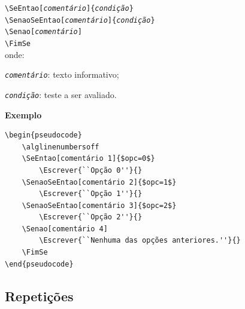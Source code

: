 \documentclass[a4paper,12pt,oneside,onecolumn,final,fleqn]{repUERJ}
\begin{document}
\begin{alinea}
  \item \texttt{\textbackslash SeEntao[\textit{comentário}]\{\textit{condição}\}}\\
        \texttt{\textbackslash SenaoSeEntao[\textit{comentário}]\{\textit{condição}\}}\\
        \texttt{\textbackslash Senao[\textit{comentário}]}\\
        \texttt{\textbackslash FimSe}\\
        onde:
        \begin{alinea}
            \item \textit{\texttt{comentário}}: texto
                  informativo;
            \item \textit{\texttt{condição}}: teste a ser
                  avaliado.\\
        \end{alinea}
\end{alinea}

\noindent\textbf{Exemplo}

\begin{verbatim}
\begin{pseudocode}
    \alglinenumbersoff
    \SeEntao[comentário 1]{$opc=0$}
        \Escrever{``Opção 0''}{}
    \SenaoSeEntao[comentário 2]{$opc=1$}
        \Escrever{``Opção 1''}{}
    \SenaoSeEntao[comentário 3]{$opc=2$}
        \Escrever{``Opção 2''}{}
    \Senao[comentário 4]
        \Escrever{``Nenhuma das opções anteriores.''}{}
    \FimSe
\end{pseudocode}
\end{verbatim}

\noindent{}

\subsection{Repetições}
\end{document}

